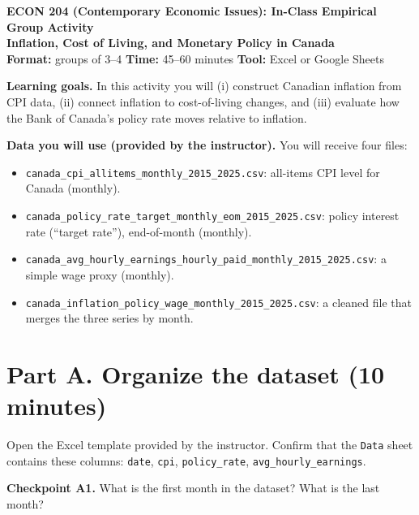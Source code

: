 \documentclass[11pt]{article}
\begin{document}
{\Large \textbf{ECON 204 (Contemporary Economic Issues): In-Class Empirical Group Activity}}\\
{\large \textbf{Inflation, Cost of Living, and Monetary Policy in Canada}}\\[0.5em]
\textbf{Format:} groups of 3--4 \hspace{1.5em} \textbf{Time:} 45--60 minutes \hspace{1.5em} \textbf{Tool:} Excel or Google Sheets

\vspace{0.75em}
\textbf{Learning goals.} In this activity you will (i) construct Canadian inflation from CPI data, (ii) connect inflation to cost-of-living changes, and (iii) evaluate how the Bank of Canada’s policy rate moves relative to inflation.

\vspace{0.75em}
\textbf{Data you will use (provided by the instructor).} You will receive four files:
\begin{itemize}
\item \texttt{canada\_cpi\_allitems\_monthly\_2015\_2025.csv}: all-items CPI level for Canada (monthly).
\item \texttt{canada\_policy\_rate\_target\_monthly\_eom\_2015\_2025.csv}: policy interest rate (``target rate''), end-of-month (monthly).
\item \texttt{canada\_avg\_hourly\_earnings\_hourly\_paid\_monthly\_2015\_2025.csv}: a simple wage proxy (monthly).
\item \texttt{canada\_inflation\_policy\_wage\_monthly\_2015\_2025.csv}: a cleaned file that merges the three series by month.
\end{itemize}

\section*{Part A. Organize the dataset (10 minutes)}
Open the Excel template provided by the instructor. Confirm that the \texttt{Data} sheet contains these columns: \texttt{date}, \texttt{cpi}, \texttt{policy\_rate}, \texttt{avg\_hourly\_earnings}. 

\vspace{0.5em}
\textbf{Checkpoint A1.} What is the first month in the dataset? What is the last month?\\[0.75em]
\underline{\hspace{0.9\linewidth}}\\[0.75em]
\underline{\hspace{0.9\linewidth}}
\end{document}
